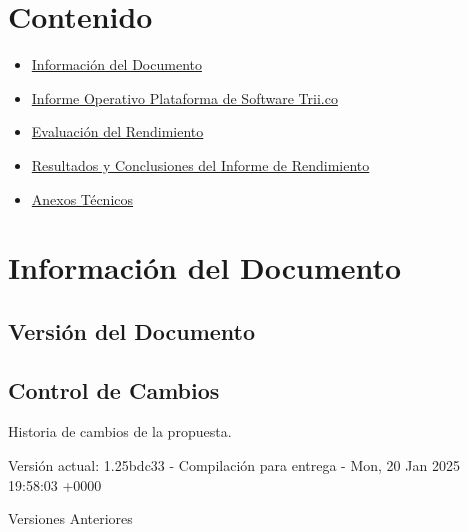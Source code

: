 \documentclass[
  paper=a4,
  ,captions=tableheading
]{scrartcl}
\providecommand{\tightlist}{%
  \setlength{\itemsep}{0pt}\setlength{\parskip}{0pt}}
\renewenvironment{quote}{\begin{customblockquote}\list{}{\rightmargin=0em\leftmargin=0em}%
\item\relax\color{blockquote-text}\ignorespaces}{\unskip\unskip\endlist\end{customblockquote}}
\begin{document}



\section{Contenido}\label{sec:contenido}

\begin{itemize}
\tightlist
\item
  \hyperref[informaciuxf3n-del-documento]{Información del Documento}
\item
  \hyperref[informe-operativo-plataforma-de-software-trii.co]{Informe
  Operativo Plataforma de Software Trii.co}
\item
  \hyperref[evaluaciuxf3n-del-rendimiento]{Evaluación del Rendimiento}
\item
  \hyperref[resultados-y-conclusiones-del-informe-de-rendimiento]{Resultados
  y Conclusiones del Informe de Rendimiento}
\item
  \hyperref[anexos-tuxe9cnicos]{Anexos Técnicos}
\end{itemize}

\newpage

\section{Información del
Documento}\label{sec:informaciuxf3n-del-documento}

\subsection{Versión del Documento}\label{sec:versiuxf3n-del-documento}

\begin{quote}
\end{quote}

\subsection{Control de Cambios}\label{sec:control-de-cambios}

Historia de cambios de la propuesta.

Versión actual: 1.25bdc33 - Compilación para entrega - Mon, 20 Jan 2025
19:58:03 +0000

Versiones Anteriores
\end{document}
